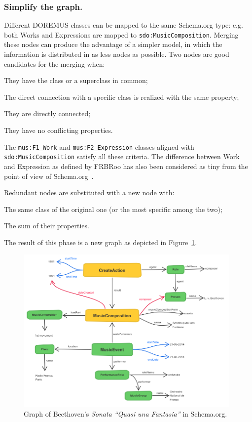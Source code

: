 \documentclass{llncs}
\begin{document}
\subsubsection{Simplify the graph.}
Different DOREMUS classes can be mapped to the same Schema.org type: e.g. both Works and Expressions are mapped to \texttt{sdo:Music\-Composition}. Merging these nodes can produce the advantage of a simpler model, in which the information is distributed in as less nodes as possible. Two nodes are good candidates for the merging when:
\begin{enumerate*}
 \item They have the class or a superclass in common;
 \item The direct connection with a specific class is realized with the same property;
 \item They are directly connected;
 \item They have no conflicting properties.
\end{enumerate*}
The \texttt{mus:F1\_Work} and \texttt{mus:F2\_Expression} classes aligned with \texttt{sdo:MusicComposition} satisfy all these criteria. The difference between Work and Expression as defined by FRBRoo has also been considered as tiny from the point of view of Schema.org~\cite{godby2013relationship}.

Redundant nodes are substituted with a new node with:
\begin{enumerate*}
\item The same class of the original one (or the most specific among the two);
\item The sum of their properties.
\end{enumerate*}
The result of this phase is a new graph as depicted in Figure~\ref{fig:beet-schema}.

\begin{figure}
 \centering
 \includegraphics[width=11cm]{img/Beethoven-Schema.png}
 \caption{Graph of Beethoven's \textit{Sonata ``Quasi una Fantasia''} in Schema.org.}
 \label{fig:beet-schema}
\end{figure}
\end{document}

